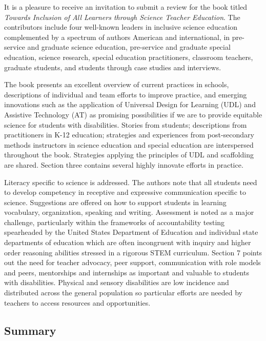 \documentclass[11.5pt]{sig-alternate} %
\begin{document}
\pagebreak
\clearpage
\begin{large}
It is a pleasure to receive an invitation to submit a review for the book titled \textit{Towards Inclusion of All Learners through Science Teacher Education}. The contributors include four well-known leaders in inclusive science education complemented by a spectrum of authors American and international, in pre-service and graduate science education, pre-service and graduate special education, science research, special education practitioners, classroom teachers, graduate students, and students through case studies and interviews.

The book presents an excellent overview of current practices in schools, descriptions of individual and team efforts to improve practice, and emerging innovations such as the application of Universal Design for Learning (UDL) and Assistive Technology (AT) as promising possibilities if we are to provide equitable science for students with disabilities.  Stories from students; descriptions from practitioners in K-12 education; strategies and experiences from post-secondary methods instructors in science education and special education are interspersed throughout the book.  Strategies applying the principles of UDL and scaffolding are shared. Section three contains several highly innovate efforts in practice.

Literacy specific to science is addressed.  The authors note that all students need to develop competency in receptive and expressive communication specific to science.  Suggestions are offered on how to support students in learning vocabulary, organization, speaking and writing.  Assessment is noted as a major challenge, particularly within the frameworks of accountability testing spearheaded by the United States Department of Education and individual state departments of education which are often incongruent with inquiry and higher order reasoning abilities stressed in a rigorous STEM curriculum.  Section 7 points out the need for teacher advocacy, peer support, communication with role models and peers, mentorships and internships as important and valuable to students with disabilities.  Physical and sensory disabilities are low incidence and distributed across the general population so particular efforts are needed by teachers to access resources and opportunities.

\subsection*{Summary}


\end{large}
\end{document}
